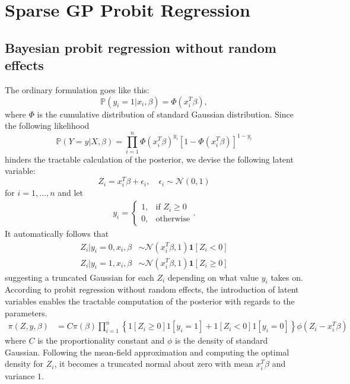 \documentclass[11pt]{article}
\newcommand{\bs}{\boldsymbol}
\begin{document}
\section{Sparse GP Probit Regression}
\subsection{Bayesian probit regression without random effects}
The ordinary formulation goes like this:
$$
  \mathbb{P}\left(y_{i}=1|x_{i}, \beta\right) = \Phi\left(x_{i}^{T}\beta\right),
$$
where $\Phi$ is the cumulative distribution of standard Gaussian distribution. Since the following likelihood
$$
  \mathbb{P}\left(Y=y|X, \beta\right) = \prod_{i=1}^{n}\Phi\left(x_{i}^{T}\beta\right)^{y_{i}}\left[1-\Phi\left(x_{i}^{T}\beta\right)\right]^{1-y_{i}}
$$
hinders the tractable calculation of the posterior, we devise the following latent variable:
$$
  Z_{i} = x_{i}^{T}\beta + \epsilon_{i}, \quad \epsilon_{i} \sim \mathcal{N}\left(0, 1\right)
$$
for $i = 1, \ldots , n$ and let
\begin{align*}
  y_{i} = \begin{cases}1, & \text{if $Z_{i} \ge 0$}\\ 0, & \text{otherwise} \end{cases}.
\end{align*}
It automatically follows that
\begin{align*}
  Z_{i}|y_{i}=0, x_{i}, \beta &\sim \mathcal{N}\left(x_{i}^{T}\beta, 1\right) \bs{1}\left[Z_{i} < 0\right]\\
  Z_{i}|y_{i}=1, x_{i}, \beta &\sim \mathcal{N}\left(x_{i}^{T}\beta, 1\right) \bs{1}\left[Z_{i}\ge 0\right]
\end{align*}
suggesting a truncated Gaussian for each $Z_{i}$ depending on what value $y_{i}$ takes on. According to probit regression without random effects, the introduction of latent variables enables the tractable computation of the posterior with regards to the parameters.
\begin{align*}
  \pi\left(Z, y, \beta\right) &= C\pi\left(\beta\right)\prod_{i=1}^{n}\left\{1\left[Z_{i}\ge 0\right]1\left[y_{i}=1\right] + 1\left[Z_{i}<0\right]1\left[y_{i}=0\right] \right\}\phi\left(Z_{i} - x_{i}^{T}\beta\right)
\end{align*}
where $C$ is the proportionality constant and $\phi$ is the density of standard Gaussian. Following the mean-field approximation and computing the optimal density for $Z_{i}$, it becomes a truncated normal about zero with mean $x_{i}^{T}\beta$ and variance $1$.
\end{document}
